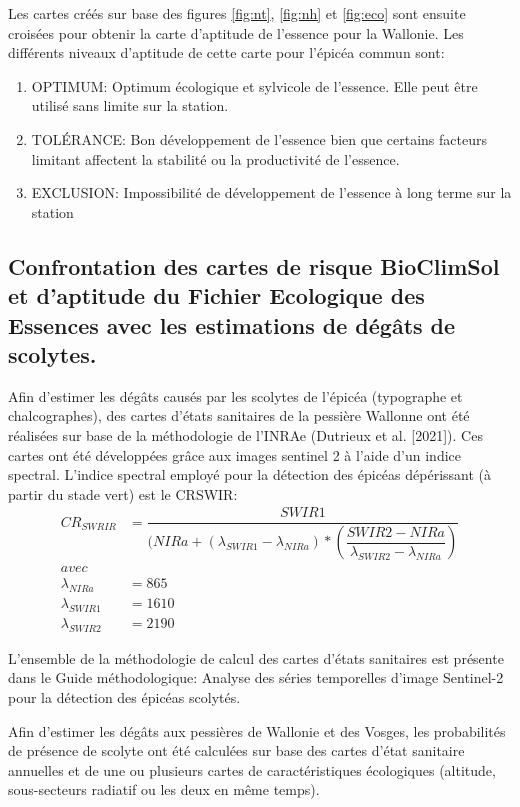 Les cartes créés sur base des figures  \ref{fig:nt}, \ref{fig:nh} et \ref{fig:eco} sont ensuite croisées pour obtenir la carte d'aptitude de l'essence pour la Wallonie. 
Les différents niveaux d'aptitude de cette carte pour l'épicéa commun sont:

\begin{enumerate}
    \item OPTIMUM: Optimum écologique et sylvicole de l'essence. Elle peut être utilisé sans limite sur la station.
    \item TOLÉRANCE: Bon développement de l'essence bien que certains facteurs limitant affectent la stabilité ou la productivité de l'essence.
    \item EXCLUSION: Impossibilité de développement de l'essence à long terme sur la station 
\end{enumerate}

\newpage
\subsection{Confrontation des cartes de risque BioClimSol et d'aptitude du Fichier Ecologique des Essences avec les estimations de dégâts de scolytes.}
Afin d'estimer les dégâts causés par les scolytes de l'épicéa (typographe et chalcographes), des cartes d'états sanitaires de la pessière Wallonne ont été réalisées sur base de la méthodologie de l'INRAe (Dutrieux et al. [2021]). Ces cartes ont été développées grâce aux images sentinel 2 à l'aide d'un indice spectral.
L'indice spectral employé pour la détection des épicéas dépérissant (à partir du stade vert) est le CRSWIR:
\begin{align*} 
CR_{SWRIR} &= \dfrac{SWIR1}{( NIRa + (\lambda_{SWIR1}-\lambda_{NIRa})* (\dfrac{SWIR2 - NIRa}{\lambda_{SWIR2}-\lambda_{NIRa}})} \\ 
avec&\\ 
\lambda_{NIRa} &=865\\ 
\lambda_{SWIR1} &=1610\\ 
\lambda_{SWIR2} &=2190
\end{align*} 

L'ensemble de la méthodologie de calcul des cartes d'états sanitaires est présente dans le  Guide méthodologique: Analyse des séries temporelles d'image Sentinel-2 pour la détection des épicéas scolytés. %

Afin d'estimer les dégâts aux pessières de Wallonie et des Vosges, les probabilités de présence de scolyte  ont été calculées sur base des cartes d'état sanitaire annuelles et de une ou  plusieurs cartes de caractéristiques écologiques (altitude, sous-secteurs radiatif ou les deux en même temps).

